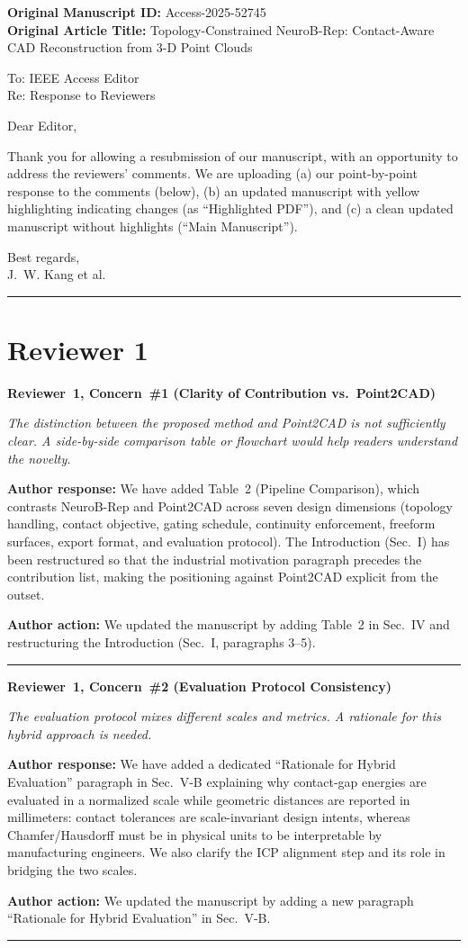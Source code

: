 \documentclass[11pt]{article}
\newcommand{\concern}[2]{\noindent\textbf{Reviewer~#1, Concern~\##2}\par}
\newcommand{\concerntext}[1]{\noindent\textit{#1}\par\medskip}
\newcommand{\authorresponse}[1]{\noindent\textbf{Author response:} #1\par\medskip}
\newcommand{\authoraction}[1]{\noindent\textbf{Author action:} We updated the manuscript by #1\par\bigskip\noindent\rule{\linewidth}{0.4pt}\par\medskip}
\begin{document}
\noindent\textbf{Original Manuscript ID:} Access-2025-52745\\
\textbf{Original Article Title:} Topology-Constrained NeuroB-Rep:
Contact-Aware CAD Reconstruction from 3-D Point Clouds

\bigskip
\noindent To: IEEE Access Editor\\
Re: Response to Reviewers

\medskip
\noindent Dear Editor,

Thank you for allowing a resubmission of our manuscript, with an opportunity
to address the reviewers' comments.
We are uploading (a) our point-by-point response to the comments (below),
(b) an updated manuscript with yellow highlighting indicating changes
(as ``Highlighted PDF''), and (c) a clean updated manuscript without
highlights (``Main Manuscript'').

Best regards,\\
J.~W. Kang et al.

\bigskip\noindent\rule{\linewidth}{0.8pt}\bigskip

\section*{Reviewer 1}

\concern{1}{1 (Clarity of Contribution vs.\ Point2CAD)}
\concerntext{The distinction between the proposed method and Point2CAD is not
sufficiently clear. A side-by-side comparison table or flowchart would
help readers understand the novelty.}
\authorresponse{We have added Table~2 (Pipeline Comparison), which contrasts
NeuroB-Rep and Point2CAD across seven design dimensions (topology
handling, contact objective, gating schedule, continuity enforcement,
freeform surfaces, export format, and evaluation protocol).
The Introduction (Sec.~I) has been restructured so that the
industrial motivation paragraph precedes the contribution list,
making the positioning against Point2CAD explicit from the outset.}
\authoraction{adding Table~2 in Sec.~IV and restructuring the Introduction
(Sec.~I, paragraphs 3--5).}

\concern{1}{2 (Evaluation Protocol Consistency)}
\concerntext{The evaluation protocol mixes different scales and metrics.
A rationale for this hybrid approach is needed.}
\authorresponse{We have added a dedicated ``Rationale for Hybrid Evaluation''
paragraph in Sec.~V-B explaining why contact-gap energies are
evaluated in a normalized scale while geometric distances are reported
in millimeters: contact tolerances are scale-invariant design intents,
whereas Chamfer/Hausdorff must be in physical units to be
interpretable by manufacturing engineers. We also clarify the
ICP alignment step and its role in bridging the two scales.}
\authoraction{adding a new paragraph ``Rationale for Hybrid Evaluation''
in Sec.~V-B.}
\end{document}
